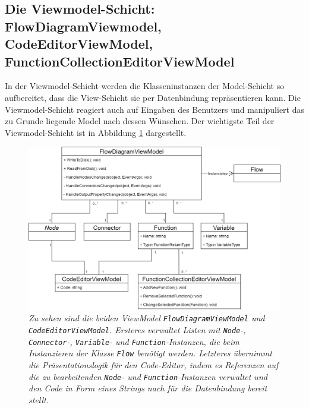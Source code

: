\subsection[Die Viewmodel-Schicht]{Die Viewmodel-Schicht: FlowDiagramViewmodel, CodeEditorViewModel, FunctionCollectionEditorViewModel}
\label{subsec:Die Viewmodel-Schicht}
In der Viewmodel-Schicht werden die Klasseninstanzen der Model-Schicht so aufbereitet, dass die View-Schicht sie per Datenbindung repräsentieren kann. Die Viewmodel-Schicht reagiert auch auf Eingaben des Benutzers und manipuliert das zu Grunde liegende Model nach dessen Wünschen. Der wichtigste Teil der Viewmodel-Schicht ist in Abbildung \ref{fig:UML:FlowViewModel} dargestellt.
\begin{figure} %
	\centering
		\includegraphics[width=\textwidth]{img/FlowDiagramViewModelUML.png}
	\caption[Klassenstruktur der ViewModelSchicht]{\textit{Zu sehen sind die beiden ViewModel \texttt{FlowDiagramViewModel} und \texttt{CodeEditorViewModel}. Ersteres verwaltet Listen mit \texttt{Node}-, \texttt{Con\-nec\-tor}-, \texttt{Variable}- und \texttt{Function}-Instanzen, die beim Instanzieren der Klasse \texttt{Flow} benötigt werden. Letzteres übernimmt die Präsentationslogik für den Code-Editor, indem es Referenzen auf die zu bearbeitenden \texttt{Node}- und \texttt{Function}-Instanzen verwaltet und den Code in Form eines Strings nach für die Datenbindung bereit stellt.}}
	\label{fig:UML:FlowViewModel}
\end{figure}
